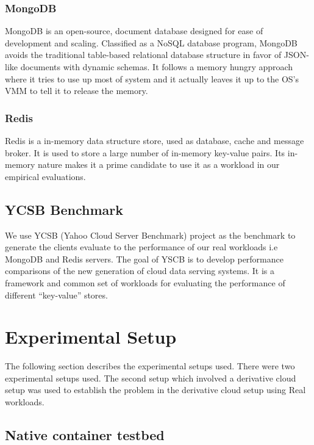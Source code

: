       \subsubsection{MongoDB}
	MongoDB \cite{mongodb} is an open-source, document database designed for ease of development and scaling. Classified as a NoSQL 
database program, MongoDB avoids the traditional table-based relational database structure in favor of JSON-like documents with dynamic 
schemas. It follows a memory hungry approach where it tries to use up most of system and it actually leaves it up to the OS's 
VMM to tell it to release the memory.

      \subsubsection{Redis}
	Redis \cite{redis} is a in-memory data structure store, used as database, cache and message broker. It is used to store a large 
number of in-memory key-value pairs. Its in-memory nature makes it a prime candidate to use it as a workload in our empirical evaluations.
   
    \subsection{YCSB Benchmark}
	We use YCSB \cite{cooper2010benchmarking} (Yahoo Cloud Server Benchmark) project as the benchmark to generate the clients evaluate 
to the performance of our real workloads i.e MongoDB and Redis servers. The goal of YSCB is to develop performance comparisons of the new 
generation of cloud data serving systems. It is a framework and common set of workloads for evaluating the performance of different 
“key-value” stores.

  \section{Experimental Setup}
  
    The following section describes the experimental setups used. There were two experimental setups used.  The second setup which involved 
a derivative cloud setup was used to establish the problem in the derivative cloud setup using Real workloads.
    
    \subsection{Native container testbed}
      \label{section_testbed_native}
      
